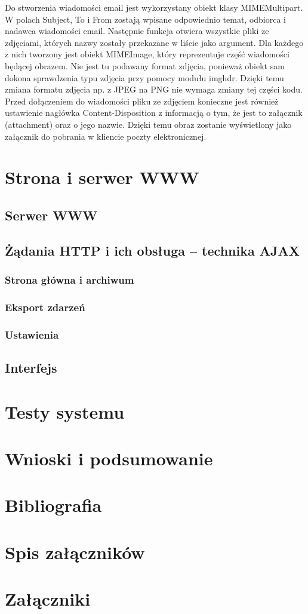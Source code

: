 \documentclass[a4paper,12pt,twoside]{article}
\begin{document}
Do stworzenia wiadomości email jest wykorzystany obiekt klasy MIMEMultipart. W polach Subject, To i From zostają wpisane odpowiednio temat, odbiorca i nadawca wiadomości email. Następnie funkcja otwiera wszystkie pliki ze zdjęciami, których nazwy zostały przekazane w liście jako argument. Dla każdego z nich tworzony jest obiekt MIMEImage, który reprezentuje część wiadomości będącej obrazem. Nie jest tu podawany format zdjęcia, ponieważ obiekt sam dokona sprawdzenia typu zdjęcia przy pomocy modułu imghdr. Dzięki temu zmiana formatu zdjęcia np. z JPEG na PNG nie wymaga zmiany tej części kodu. Przed dołączeniem do wiadomości pliku ze zdjęciem konieczne jest również ustawienie nagłówka Content-Disposition z informacją o tym, że jest to załącznik (attachment) oraz o jego nazwie. Dzięki temu obraz zostanie wyświetlony jako załącznik do pobrania w kliencie poczty elektronicznej.

\section{Strona i serwer WWW}

\subsection{Serwer WWW}

\subsection{Żądania HTTP i ich obsługa -- technika AJAX}

\subsubsection{Strona główna i archiwum}

\subsubsection{Eksport zdarzeń}

\subsubsection{Ustawienia}

\subsection{Interfejs}

\section{Testy systemu}

\section{Wnioski i podsumowanie}

\section{Bibliografia}

\section{Spis załączników}

\section{Załączniki}
\end{document}
